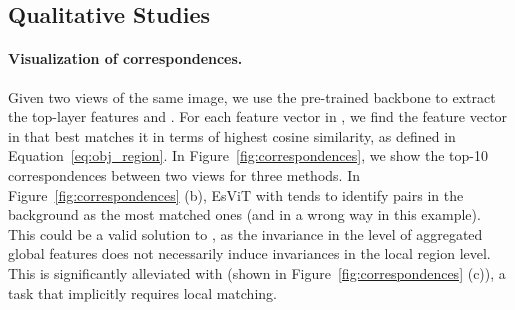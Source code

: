 \documentclass{article} \usepackage{iclr2022_conference,times}
\newcommand{\shortname}{EsViT}
\begin{document}
\begin{table}[t!]
  \centering
  \centering
  \vspace{-2mm}
  \caption{Comparison between contrastive and non-contrastive region-matching tasks.}
  \label{table:region_matching}  
\vspace{-6mm}
\end{table}

\vspace{-2mm}
\subsection{Qualitative Studies}
\vspace{-2mm}

\paragraph{Visualization of correspondences.}  
Given two views of the same image, we use the pre-trained backbone to extract the top-layer features  and . 
For each feature vector in , we find the feature vector in  that best matches it in terms of highest cosine similarity, as defined in Equation~\eqref{eq:obj_region}. In Figure~\ref{fig:correspondences}, we show the top-10 correspondences between two views for three methods. 
In Figure~\ref{fig:correspondences} (b), 
\shortname{} with  tends to identify pairs in the background as the most matched ones (and in a wrong way in this example). This could be a valid solution to , as the invariance in the level of aggregated global features does not necessarily induce invariances in the local region level. This is significantly alleviated with  (shown in Figure~\ref{fig:correspondences} (c)), a task that implicitly requires local matching. 
\end{document}
